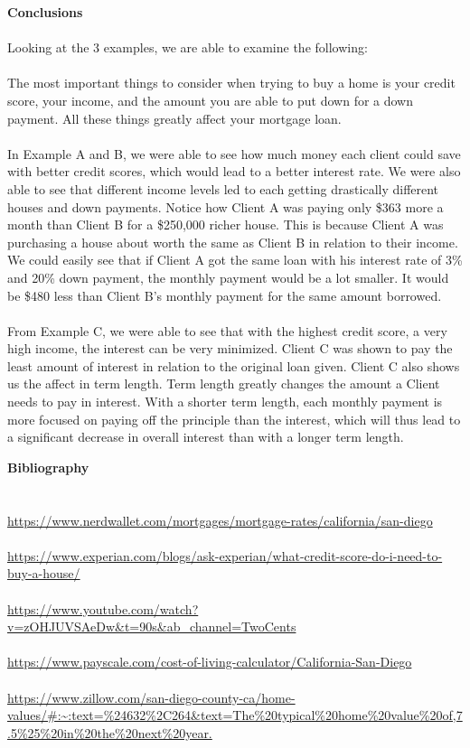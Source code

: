 \documentclass[12pt]{article}
\newenvironment{Section}[1]{}{\newpage}
\begin{document}
	\begin{Section}{Conclusions}
		\textbf{\Huge Conclusions}
		\\ \\
		Looking at the 3 examples, we are able to examine the following:
		\\ \\
		The most important things to consider when trying to buy a home is your credit score, your income, and the amount you are able to put down for a down payment.  All these things greatly affect your mortgage loan.  
		\\ \\
		In Example A and B, we were able to see how much money each client could save with better credit scores, which would lead to a better interest rate.  We were also able to see that different income levels led to each getting drastically different houses and down payments.  Notice how Client A was paying only \$363 more a month than Client B for a \$250,000 richer house.  This is because Client A was purchasing a house about worth the same as Client B in relation to their income.  We could easily see that if Client A got the same loan with his interest rate of 3\% and 20\% down payment, the monthly payment would be a lot smaller. It would be \$480 less than Client B's monthly payment for the same amount borrowed. 
		\\ \\ 
		From Example C, we were able to see that with the highest credit score, a very high income, the interest can be very minimized.  Client C was shown to pay the least amount of interest in relation to the original loan given.  Client C also shows us the affect in term length.  Term length greatly changes the amount a Client needs to pay in interest.  With a shorter term length, each monthly payment is more focused on paying off the principle than the interest, which will thus lead to a significant decrease in overall interest than with a longer term length. 
	\end{Section}
	
	\begin{Section}{Bibliography}
		\textbf{\Huge Bibliography}
		\\ \\ \\
		\url{https://www.nerdwallet.com/mortgages/mortgage-rates/california/san-diego}
		\\ \\
		\url{https://www.experian.com/blogs/ask-experian/what-credit-score-do-i-need-to-buy-a-house/}
		\\ \\
		\url{https://www.youtube.com/watch?v=zOHJUVSAeDw&t=90s&ab_channel=TwoCents}
		\\ \\
		\url{https://www.payscale.com/cost-of-living-calculator/California-San-Diego}
		\\ \\
		\url{https://www.zillow.com/san-diego-county-ca/home-values/#:~:text=%24632%2C264&text=The%20typical%20home%20value%20of,7.5%25%20in%20the%20next%20year.}
	\end{Section}
\end{document}
